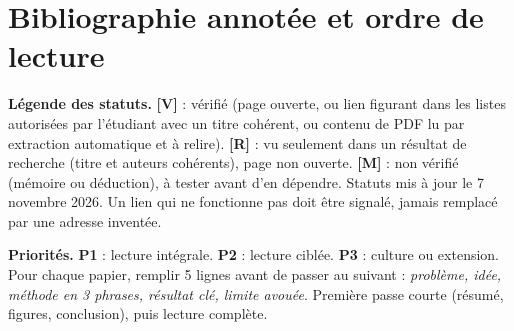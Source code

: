\documentclass[11pt,a4paper]{article}
\newcommand{\sV}{\textbf{[V]}}
\newcommand{\sR}{\textbf{[R]}}
\newcommand{\sM}{\textbf{[M]}}
\begin{document}
\section{Bibliographie annotée et ordre de lecture}
\label{app:biblio}

\textbf{Légende des statuts.} \sV{} : vérifié (page ouverte, ou lien figurant dans les listes autorisées par l'étudiant avec un titre cohérent, ou contenu de PDF lu par extraction automatique et à relire). \sR{} : vu seulement dans un résultat de recherche (titre et auteurs cohérents), page non ouverte. \sM{} : non vérifié (mémoire ou déduction), à tester avant d'en dépendre. Statuts mis à jour le 7 novembre 2026. Un lien qui ne fonctionne pas doit être signalé, jamais remplacé par une adresse inventée.

\textbf{Priorités.} \textbf{P1} : lecture intégrale. \textbf{P2} : lecture ciblée. \textbf{P3} : culture ou extension. Pour chaque papier, remplir 5 lignes avant de passer au suivant : \emph{problème, idée, méthode en 3 phrases, résultat clé, limite avouée}. Première passe courte (résumé, figures, conclusion), puis lecture complète.
\end{document}
